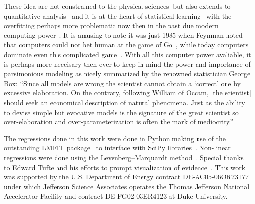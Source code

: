 \documentclass[10pt,aps,prc,twocolumn]{revtex4-1}
\begin{document}
These idea are not constrained to the physical sciences, but also extends 
to quantitative analysis~\cite{Brighton:2015} and it is at the heart of statistical 
learning~\cite{Hastie:2009} with the overfitting perhaps more problematic now then
in the past due modern computing power~\cite{Cawley:2010}.   It is amusing to note it
was just 1985 when Feynman noted that computers could not bet human at the
game of Go~\cite{Feynman:2008}, while today computers dominate even this complicated game~\cite{Silver:2016,Barradas:2018}.
With all this computer power avaliable, it is perhaps more neccisary then ever
to keep in mind the power and importance of parsimonious modeling as nicely 
summarized by the renowned statistician George Box: 
``Since all models are wrong the scientist cannot obtain a `correct' one
by excessive elaboration.  On the contrary, following William of Occam, 
[the scientist] should seek an economical description of natural phenomena. 
Just as the ability to devise simple but evocative models is the signature of the
great scientist so over-elaboration and over-parameterization is often
the mark of mediocrity.''~\cite{Box76}


\begin{acknowledgments}
The regressions done in this work were done in Python making use of the
outstanding LMFIT package~\cite{Newville:2014} to interface with SciPy
libraries~\cite{Jones:2001}.  Non-linear regressions were done using the
Levenberg–Marquardt method~\cite{Levenberg:1944,Marquardt:1963}.  Special
thanks to Edward Tufte and his efforts to prompt visualization of evidence~\cite{Tufte:2006}.
This work was supported by the U.S.  Department of Energy contract DE-AC05-06OR23177
under which Jefferson Science Associates operates the Thomas Jefferson National 
Accelerator Facility and contract DE-FG02-03ER4123 at Duke University.
\end{acknowledgments}
\end{document}
